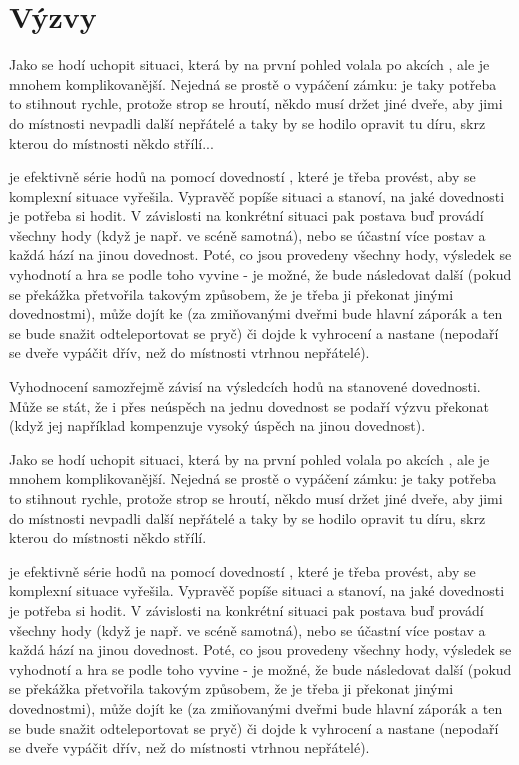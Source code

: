 \documentclass[../main.tex]{subfiles}
\begin{document}
\section{Výzvy}
\label{sec:vyzvy}

Jako  se hodí uchopit situaci, která by na první pohled volala po akcích , ale je mnohem komplikovanější. Nejedná se prostě o vypáčení zámku: je taky potřeba to stihnout rychle, protože strop se hroutí, někdo musí držet jiné dveře, aby jimi do místnosti nevpadli další nepřátelé a taky by se hodilo opravit tu díru, skrz kterou do místnosti někdo střílí...

 je efektivně série hodů na  pomocí  dovedností , které je třeba provést, aby se komplexní situace vyřešila. Vypravěč popíše situaci a stanoví, na jaké dovednosti je potřeba si hodit. V závislosti na konkrétní situaci pak postava buď provádí všechny hody (když je např. ve scéně samotná), nebo se  účastní více postav a každá hází na jinou dovednost. Poté, co jsou provedeny všechny hody, výsledek  se vyhodnotí a hra se podle toho vyvine - je možné, že bude následovat další  (pokud se překážka přetvořila takovým způsobem, že je třeba ji překonat jinými dovednostmi), může dojít ke  (za zmiňovanými dveřmi bude hlavní záporák a ten se bude snažit odteleportovat se pryč) či dojde k vyhrocení a nastane  (nepodaří se dveře vypáčit dřív, než do místnosti vtrhnou nepřátelé).

Vyhodnocení  samozřejmě závisí na výsledcích hodů na stanovené dovednosti. Může se stát, že i přes neúspěch na jednu dovednost se podaří výzvu překonat (když jej například kompenzuje vysoký úspěch na jinou dovednost).

Jako  se hodí uchopit situaci, která by na první pohled volala po akcích , ale je mnohem komplikovanější. Nejedná se prostě o vypáčení zámku: je taky potřeba to stihnout rychle, protože strop se hroutí, někdo musí držet jiné dveře, aby jimi do místnosti nevpadli další nepřátelé a taky by se hodilo opravit tu díru, skrz kterou do místnosti někdo střílí.

 je efektivně série hodů na  pomocí  dovedností , které je třeba provést, aby se komplexní situace vyřešila. Vypravěč popíše situaci a stanoví, na jaké dovednosti je potřeba si hodit. V závislosti na konkrétní situaci pak postava buď provádí všechny hody (když je např. ve scéně samotná), nebo se  účastní více postav a každá hází na jinou dovednost. Poté, co jsou provedeny všechny hody, výsledek  se vyhodnotí a hra se podle toho vyvine - je možné, že bude následovat další  (pokud se překážka přetvořila takovým způsobem, že je třeba ji překonat jinými dovednostmi), může dojít ke  (za zmiňovanými dveřmi bude hlavní záporák a ten se bude snažit odteleportovat se pryč) či dojde k vyhrocení a nastane  (nepodaří se dveře vypáčit dřív, než do místnosti vtrhnou nepřátelé).
\end{document}
